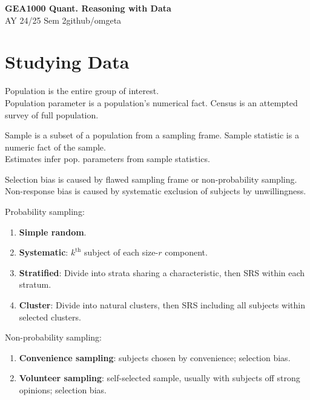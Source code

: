 \documentclass[12pt, a4paper]{article}
\newcommand{\mytitle}{GEA1000 Quant. Reasoning with Data}
\newcommand{\myauthor}{github/omgeta}
\newcommand{\mydate}{AY 24/25 Sem 2}
\begin{document}
\raggedright
\footnotesize
\begin{multicols*}{3}
\setlength{\premulticols}{1pt}
\setlength{\postmulticols}{1pt}
\setlength{\multicolsep}{1pt}
\setlength{\columnsep}{2pt}

{\normalsize{\textbf{\mytitle}}} \\
{\footnotesize{\mydate\hspace{2pt}\textemdash\hspace{2pt}\myauthor}}\vspace{-1pt}
\section{Studying Data}
Population is the entire group of interest.\\ Population parameter is a population's numerical fact. Census is an attempted survey of full population.

Sample is a subset of a population from a sampling frame. Sample statistic is a numeric fact of the sample. \\Estimates infer pop. parameters from sample statistics. 

Selection bias is caused by flawed sampling frame or non-probability sampling. Non-response bias is caused by systematic exclusion of subjects by unwillingness.

Probability sampling:
\begin{enumerate}[\roman*.]
  \item \textbf{Simple random}.
  \item \textbf{Systematic}: $k^{\text{th}}$ subject of each size-$r$ component.
  \item \textbf{Stratified}: Divide into strata sharing a characteristic, then SRS within each stratum. 
  \item \textbf{Cluster}: Divide into natural clusters, then SRS including all subjects within selected clusters.
\end{enumerate}

Non-probability sampling:
\begin{enumerate}[\roman*.]
  \item \textbf{Convenience sampling}: subjects chosen by convenience; selection bias.
  \item \textbf{Volunteer sampling}: self-selected sample, usually with subjects off strong opinions; selection bias.
\end{enumerate}


\end{multicols*}
\end{document}
